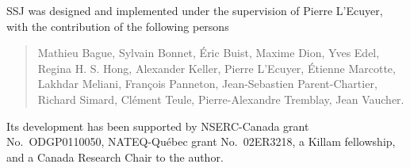 \documentclass[12pt]{article}
\begin{document}
SSJ was designed and implemented under the supervision of 
Pierre L'Ecuyer, with the contribution of the following persons
\begin{verse}
Mathieu Bague,
Sylvain Bonnet,
 \'Eric Buist, 
Maxime Dion,
 Yves Edel,
 Regina H.{} S.{} Hong, 
 Alexander Keller,
 Pierre L'Ecuyer, 
 \'Etienne Marcotte,
 Lakhdar Meliani, 
 Fran\c{c}ois Panneton,
Jean-Sebastien Parent-Chartier,
 Richard Simard,
 Cl\'ement Teule,
  Pierre-Alexandre Tremblay, 
 Jean Vaucher.
\end{verse}

Its development has been supported by NSERC-Canada grant No.\ ODGP0110050,
NATEQ-Qu\'ebec grant No.\ 02ER3218, a Killam fellowship,
and a Canada Research Chair to the author.



\end{document}

